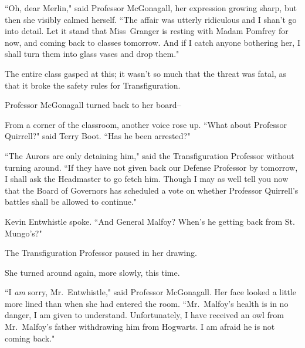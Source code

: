 ``Oh, dear Merlin," said Professor McGonagall, her expression growing sharp, but then she visibly calmed herself. ``The affair was utterly ridiculous and I shan't go into detail. Let it stand that Miss~Granger is resting with Madam Pomfrey for now, and coming back to classes tomorrow. And if I catch anyone bothering her, I shall turn them into glass vases and drop them."

The entire class gasped at this; it wasn't so much that the threat was fatal, as that it broke the safety rules for Transfiguration.

Professor McGonagall turned back to her board\---

From a corner of the classroom, another voice rose up. ``What about Professor Quirrell?" said Terry Boot. ``Has he been arrested?"

``The Aurors are only detaining him," said the Transfiguration Professor without turning around. ``If they have not given back our Defense Professor by tomorrow, I shall ask the Headmaster to go fetch him. Though I may as well tell you now that the Board of Governors has scheduled a vote on whether Professor Quirrell's battles shall be allowed to continue."

Kevin Entwhistle spoke. ``And General Malfoy? When's he getting back from St. Mungo's?"

The Transfiguration Professor paused in her drawing.

She turned around again, more slowly, this time.

``I \emph{am} sorry, Mr.~Entwhistle," said Professor McGonagall. Her face looked a little more lined than when she had entered the room. ``Mr.~Malfoy's health is in no danger, I am given to understand. Unfortunately, I have received an owl from Mr.~Malfoy's father withdrawing him from Hogwarts. I am afraid he is not coming back."
